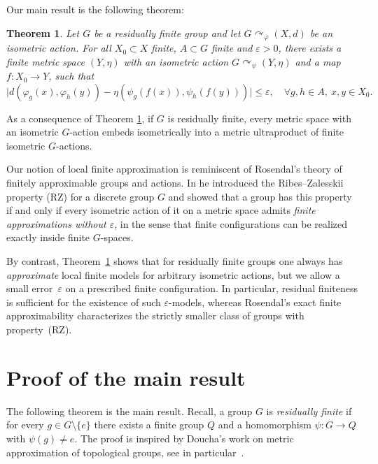 \documentclass[11pt,a4paper]{amsproc}
\numberwithin{equation}{section}
\newtheorem{theorem}{Theorem}[section]
\theoremstyle{definition}
\begin{document}
\medskip

Our main result is the following theorem:
\begin{theorem} \label{thm:main}
Let $G$ be a residually finite group and let $G \curvearrowright_{\varphi} (X,d)$ be an isometric action. For all $X_0 \subset X$ finite, $A \subset G$ finite and $\varepsilon>0$, there exists a finite metric space $(Y,\eta)$ with an isometric action $G \curvearrowright_\psi (Y,\eta)$ and a map $f \colon X_0 \to Y$, such that
\[
\bigl|d(\varphi_g(x),\varphi_h(y)) - \eta(\psi_g(f(x)),\psi_h(f(y)))\bigr|\leq \varepsilon,
\quad \forall g,h \in A, \ x,y\in X_0.
\]
\end{theorem}

As a consequence of Theorem \ref{thm:main}, if $G$ is residually finite, every metric space with an isometric $G$-action embeds isometrically into a metric ultraproduct of finite isometric $G$-actions.

Our notion of local finite approximation is reminiscent of Rosendal's theory of
finitely approximable groups and actions. In \cite{RosendalRZ} he introduced the
Ribes--Zalesskii property (RZ) for a discrete group $G$ and showed that a group has
this property if and only if every isometric action of it on a metric space admits
\emph{finite approximations without $\varepsilon$}, in the sense that finite
configurations can be realized exactly inside finite $G$-spaces.

By contrast, Theorem~\ref{thm:main} shows that for residually finite groups one
always has \emph{approximate} local finite models for arbitrary isometric
actions, but we allow a small error~$\varepsilon$ on a prescribed finite
configuration. In particular, residual finiteness is sufficient for the
existence of such $\varepsilon$-models, whereas Rosendal's exact finite approximability characterizes the strictly smaller class of groups with
property~(RZ).

\section{Proof of the main result}

The following theorem is the main result. Recall, a group $G$ is \emph{residually finite} if for every $g\in G\setminus\{e\}$ there exists a finite group $Q$ and a homomorphism $\psi\colon G\to Q$ with $\psi(g)\neq e$. The proof is inspired
by Doucha's work on metric approximation of topological groups,
see in particular~\cite[Proposition 3.9]{DouchaMetricTopGroups}.
\end{document}
